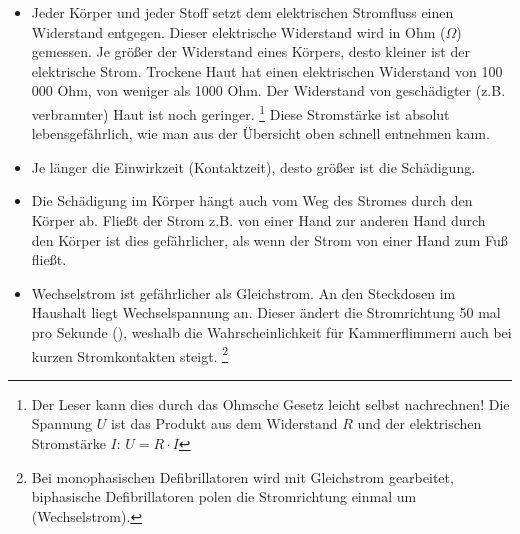 \documentclass[ngerman,paper=a4,fontsize=8pt,headings=small,draft=no,parskip=half,noonelinecaption]{scrreprt}
\begin{document}
\begin{itemize}
{\begin{itemize}
		\item Bei Stromstärken  kommt es aufgrund der Muskelkontraktionen zu krampfhaften Festhalten der berührten Stromquelle. \cite{BoehmerTaschRett6}
		\item Stromstärken  sind ! \cite{BoehmerTaschRett6}
		\item Stromstärken  führen zu Atemlähmungen und Kammerflimmern! \cite{Jaros1}
		\item Stromstärken  führen zusätzlich zu Verbrennungen, Verkochungen und Verkohlungen. \cite{LPN3}
		\end{itemize}
}
	\item {} Jeder Körper und
	jeder Stoff setzt dem elektrischen Stromfluss einen
	Widerstand entgegen. Dieser elektrische Widerstand wird in
	Ohm ($\Omega$) gemessen. Je größer der Widerstand eines
	Körpers, desto kleiner ist der elektrische Strom. Trockene
	Haut hat einen elektrischen Widerstand von 100 000 Ohm,
	 von
	weniger als 1000 Ohm. Der Widerstand von geschädigter
	(z.B. verbrannter) Haut ist noch geringer. \footnote{Der Leser kann dies durch das Ohmsche Gesetz leicht selbst nachrechnen! Die Spannung $U$ ist das Produkt aus dem Widerstand $R$ und der elektrischen Stromstärke $I$: $U=R \cdot I$} Diese Stromstärke ist absolut lebensgefährlich, wie man aus der Übersicht oben schnell entnehmen kann.
	\item {} Je länger die Einwirkzeit (Kontaktzeit), desto größer ist die Schädigung.
	\item {} Die Schädigung im Körper hängt auch vom Weg des Stromes durch den Körper ab. Fließt der Strom z.B. von einer Hand zur anderen Hand durch den Körper ist dies gefährlicher, als wenn der Strom von einer Hand zum Fuß fließt.
	\item {} Wechselstrom ist gefährlicher als Gleichstrom. An den Steckdosen im Haushalt liegt Wechselspannung an. Dieser ändert die Stromrichtung 50 mal pro Sekunde (), weshalb die Wahrscheinlichkeit für Kammerflimmern auch bei kurzen Stromkontakten steigt. \cite{RedelsteinerHRNS1} \footnote{Bei monophasischen Defibrillatoren wird mit Gleichstrom gearbeitet, biphasische Defibrillatoren polen die Stromrichtung einmal um (Wechselstrom).} 
\end{itemize}
\end{document}
